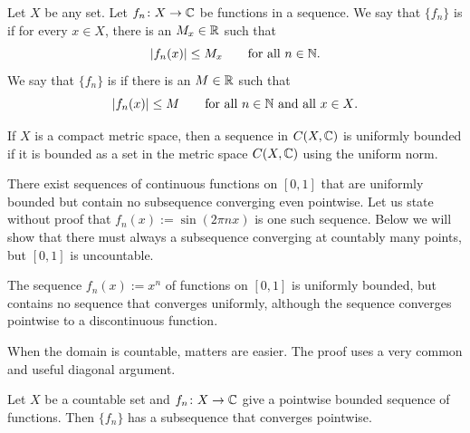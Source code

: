 \begin{defn}
Let $X$ be any set.
Let $f_n \colon X \to {\mathbb{C}}$ be functions in a sequence.  We say that
$\{ f_n \}$
is \emph{} if for every $x \in X$, there is an $M_x \in {\mathbb{R}}$
such that
\begin{equation*}
\lvert {f_n(x)} \rvert \leq M_x \qquad \text{for all $n \in {\mathbb{N}}$} .
\end{equation*}
We say that
$\{ f_n \}$
is \emph{} if there is an $M \in {\mathbb{R}}$
such that
\begin{equation*}
\lvert {f_n(x)} \rvert \leq M \qquad \text{for all $n \in {\mathbb{N}}$ and all $x \in X$}.
\end{equation*}
\end{defn}

If $X$ is a compact metric space, then a sequence in $C(X,{\mathbb{C}})$
is uniformly bounded if it is bounded as a set in the metric space
$C(X,{\mathbb{C}})$ using the uniform norm.

\begin{example}
There exist sequences of 
continuous functions
on $[0,1]$ that are uniformly bounded but contain no subsequence converging
even pointwise.
Let us state without proof that $f_n(x) := \sin (2\pi n x)$ is one
such sequence.
Below we will show that there must always a subsequence converging at countably
many points, but $[0,1]$ is uncountable.
\end{example}

\begin{example}
The sequence $f_n(x) := x^n$ of functions on $[0,1]$
is uniformly bounded, but contains no sequence that converges
uniformly,
although the sequence converges pointwise to a discontinuous function.
\end{example}

When the domain is countable, matters are easier.   The proof uses
a very common and useful diagonal argument.

\begin{prop} \label{prop:subsequenceoncountableX}
Let $X$ be a countable set and $f_n \colon X \to {\mathbb{C}}$ give a pointwise bounded
sequence of functions.  Then $\{ f_n \}$ has a subsequence that converges
pointwise.
\end{prop}


